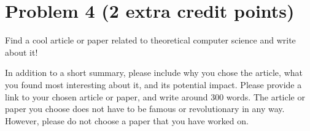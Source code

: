 \documentclass{../homework}
\begin{document}

\clearpage
\section{Problem 4 (2 extra credit points)}
Find a cool article or paper related to theoretical computer science and write about it!

In addition to a short summary, please include why you chose the article, what you found most interesting about it, and its potential impact. Please provide a link to your chosen article or paper, and write around 300 words. The article or paper you choose does not have to be famous or revolutionary in any way. However, please do not choose a paper that you have worked on.
\end{document}
